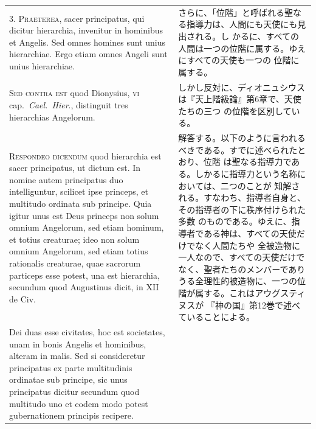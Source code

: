 \documentclass[paper=a4paper,fontsize=10pt,jafontsize=9pt,titlepage]{jlreq}
\begin{document}
\begin{longtable}{p{21em}p{21em}}
3. {\scshape Praeterea}, sacer principatus, qui dicitur hierarchia, invenitur in
hominibus et Angelis. Sed omnes homines sunt unius hierarchiae. Ergo
etiam omnes Angeli sunt unius hierarchiae.

&

さらに、「位階」と呼ばれる聖なる指導力は、人間にも天使にも見出される。し
かるに、すべての人間は一つの位階に属する。ゆえにすべての天使も一つの
位階に属する。

\\



{\scshape Sed contra est} quod Dionysius, {\scshape vi} cap.~{\itshape Cael.~Hier}., distinguit tres
hierarchias Angelorum.

&

しかし反対に、ディオニュシウスは『天上階級論』第6章で、天使たちの三つ
の位階を区別している。

\\


{\scshape Respondeo dicendum} quod hierarchia est sacer principatus, ut dictum
est. In nomine autem principatus duo intelliguntur, scilicet ipse
princeps, et multitudo ordinata sub principe. Quia igitur unus est
Deus princeps non solum omnium Angelorum, sed etiam hominum, et totius
creaturae; ideo non solum omnium Angelorum, sed etiam totius
rationalis creaturae, quae sacrorum particeps esse potest, una est
hierarchia, secundum quod Augustinus dicit, in XII de Civ. 


&

解答する。以下のように言われるべきである。すでに述べられたとおり、位階
は聖なる指導力である。しかるに指導力という名称においては、二つのことが
知解される。すなわち、指導者自身と、その指導者の下に秩序付けられた多数
のものである。ゆえに、指導者である神は、すべての天使だけでなく人間たちや
全被造物に一人なので、すべての天使だけでなく、聖者たちのメンバーであり
うる全理性的被造物に、一つの位階が属する。これはアウグスティヌスが
『神の国』第12巻で述べていることによる。



\\


Dei duas esse civitates, hoc est societates, unam in bonis Angelis et
hominibus, alteram in malis. Sed si consideretur principatus ex parte
multitudinis ordinatae sub principe, sic unus principatus dicitur
secundum quod multitudo uno et eodem modo potest gubernationem
principis recipere.


&


\\



\end{longtable}
\end{document}
